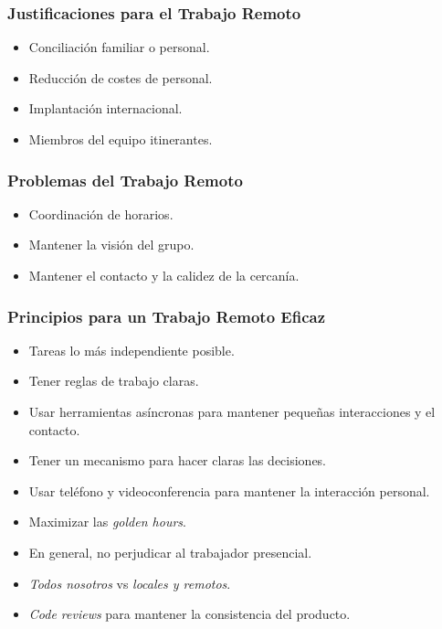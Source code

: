 \documentclass[a4paper,slidestop,xcolor=pst,dvips,blue]{beamer}
\begin{document}
\begin{frame}[c]
	\frametitle{Justificaciones para el Trabajo Remoto}
	\begin{itemize}[<+->]
        \item Conciliación familiar o personal.
        \item Reducción de costes de personal.
        \item Implantación internacional.
        \item Miembros del equipo itinerantes.
	\end{itemize}
\end{frame}

\begin{frame}[c]
	\frametitle{Problemas del Trabajo Remoto}
	\begin{itemize}[<+->]
        \item Coordinación de horarios.
        \item Mantener la visión del grupo.
        \item Mantener el contacto y la calidez de la cercanía.
	\end{itemize}
\end{frame}

\begin{frame}[c]
	\frametitle{Principios para un Trabajo Remoto Eficaz}
	\begin{itemize}[<+->]
        \item Tareas lo más independiente posible.
        \item Tener reglas de trabajo claras.
        \item Usar herramientas asíncronas para mantener pequeñas interacciones y el contacto.
        \item Tener un mecanismo para hacer claras las decisiones.
        \item Usar teléfono y videoconferencia para mantener la interacción personal.
        \item Maximizar las \emph{golden hours}.
        \item En general, no perjudicar al trabajador presencial.
        \item \emph{Todos nosotros} vs \emph{locales y remotos}.
        \item \emph{Code reviews} para mantener la consistencia del producto.
	\end{itemize}
\end{frame}

\end{document}
